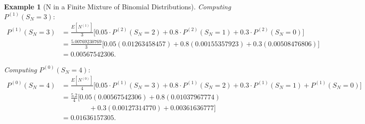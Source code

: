 \documentclass[11pt]{amsart}
\theoremstyle{definition}
\newtheorem{example}{Example}
\theoremstyle{plain}
\begin{document}
\begin{example}[N in a Finite Mixture of Binomial Distributions]
\noindent\textit{Computing} $P^{(1)}(S_N = 3)$:
\begin{align*}
P^{(1)}(S_N = 3)
    &= \frac{E[N^{(1)}]}{3}
       \bigl[0.05 \cdot P^{(2)}(S_N = 2) + 0.8 \cdot P^{(2)}(S_N = 1)
       + 0.3 \cdot P^{(2)}(S_N = 0)\bigr] \\
    &= \frac{5.00769230769}{3}
       \bigl[0.05(0.01263458457) + 0.8(0.00155357923)
       + 0.3(0.00508476806)\bigr] \\
    &= 0.00567542306.
\end{align*}

\noindent\textit{Computing} $P^{(0)}(S_N = 4)$:
\begin{align*}
P^{(0)}(S_N = 4)
    &= \frac{E[N^{(0)}]}{4}
       \bigl[0.05 \cdot P^{(1)}(S_N = 3) + 0.8 \cdot P^{(1)}(S_N = 2)
       + 0.3 \cdot P^{(1)}(S_N = 1) + P^{(1)}(S_N = 0)\bigr] \\
    &= \frac{5.2}{4}
       \bigl[0.05(0.00567542306) + 0.8(0.01037967774) \\
    &\qquad\qquad + 0.3(0.00127314770) + 0.00361636777\bigr] \\
    &= \boxed{0.01636157305}.
\end{align*}
\end{example}
\end{document}
